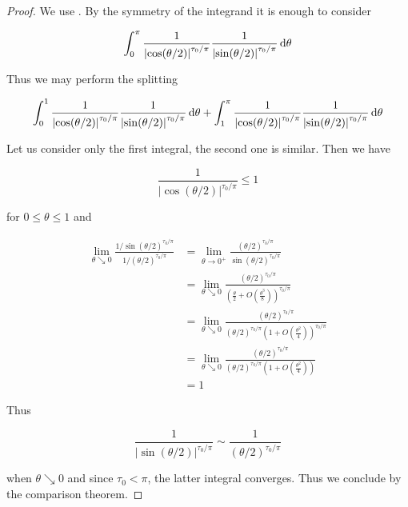 \begin{proof}
	We use \cite[153--154]{elstrodt:mass:2011}. By the symmetry of the integrand it is enough to consider 

	\begin{equation*}
		\int_{0}^\pi \frac{1}{\left| \cos(\theta/2) \right|^{\tau_0/\pi}}\frac{1}{\left| \sin(\theta/2) \right|^{\tau_0/\pi}} \mathop{}\!\mathrm{d} \theta
	\end{equation*}

	Thus we may perform the splitting 
	
	\begin{equation*}
		\int_{0}^1 \frac{1}{\left| \cos(\theta/2) \right|^{\tau_0/\pi}}\frac{1}{\left| \sin(\theta/2) \right|^{\tau_0/\pi}} \mathop{}\!\mathrm{d} \theta + \int_{1}^\pi \frac{1}{\left| \cos(\theta/2) \right|^{\tau_0/\pi}}\frac{1}{\left| \sin(\theta/2) \right|^{\tau_0/\pi}} \mathop{}\!\mathrm{d}\theta
	\end{equation*}
	
	Let us consider only the first integral, the second one is similar. Then we have 
	
	\begin{equation*}
		\frac{1}{\left| \cos(\theta/2) \right|^{\tau_0/\pi}} \leq 1 	\end{equation*}
	
	\noindent for $0 \leq \theta \leq 1$ and 
	
	\begin{equation*}
		\begin{aligned}
			\lim_{\theta \searrow 0}\frac{1/\sin(\theta/2)^{\tau_0/\pi}}{1/(\theta/2)^{\tau_0/\pi}} &=\lim_{\theta \to 0^+} \frac{(\theta/2)^{\tau_0/\pi}}{\sin(\theta/2)^{\tau_0/\pi}}\\ 
			&= \lim_{\theta \searrow 0} \frac{(\theta/2)^{\tau_0/\pi}}{\left(\frac{\theta}{2} + O\left(\frac{\theta^3}{8}\right)\right)^{\tau_0/\pi}}\\
			&= \lim_{\theta \searrow 0} \frac{(\theta/2)^{\tau_0/\pi}}{(\theta/2)^{\tau_0/\pi}\left(1 + O\left(\frac{\theta^2}{4}\right)\right)^{\tau_0/\pi}}\\ 
			&= \lim_{\theta \searrow 0} \frac{(\theta/2)^{\tau_0/\pi}}{(\theta/2)^{\tau_0/\pi}\left(1 + O\left(\frac{\theta^2}{4}\right)\right)}\\ 
			&= 1 
		\end{aligned}
	\end{equation*} 
	
	Thus 
	
	\begin{equation*}
		\frac{1}{\left| \sin(\theta/2) \right|^{\tau_0/\pi}} \sim\frac{1}{\left( \theta/2 \right)^{\tau_0/\pi}}
	\end{equation*}
	
	\noindent when $\theta \searrow 0$ and since $\tau_0 < \pi$, the latter integral converges. Thus we conclude by the comparison theorem.
\end{proof}

